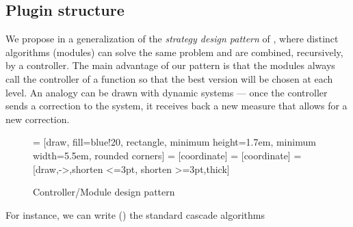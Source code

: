 \documentclass[a4paper]{article}
\begin{document}
\subsection{Plugin structure}\label{ssec:plugin}
%
We propose in  a generalization of the \emph{strategy
  design pattern} of \cite[Fig 2.]{Cung:2006:TC}, where distinct
algorithms (modules) can solve the
same problem and are combined, recursively, by a controller.
The main advantage of our pattern is that the modules always call
the controller of a function so that the best version will be chosen
at each level.
An analogy can be drawn with dynamic systems --- once the controller sends a
correction to the system, it receives back a new measure that allows for a new
correction.
%
\par
% 
\begin{wrapfigure}{r}{0.41\textwidth}
	\begin{center}
	\small
{} = [draw, fill=blue!20, rectangle,
    minimum height=1.7em, minimum width=5.5em, rounded corners]
 = [coordinate]
 = [coordinate]
 = [draw,->,shorten <=3pt, shorten >=3pt,thick]
{}
\caption{Controller/Module design pattern}
\label{fig:diag:patt}
\end{center}
\end{wrapfigure}
%
%
%
%
For instance, we can write () the standard cascade algorithms
\end{document}
